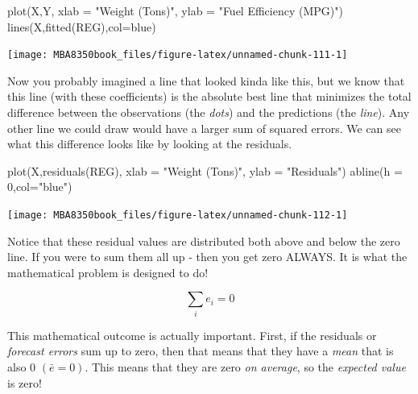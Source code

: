 \documentclass[
]{book}
\newenvironment{Shaded}{\begin{snugshade}}{\end{snugshade}}
\newcommand{\AttributeTok}[1]{\textcolor[rgb]{0.77,0.63,0.00}{#1}}
\newcommand{\DecValTok}[1]{\textcolor[rgb]{0.00,0.00,0.81}{#1}}
\newcommand{\FunctionTok}[1]{\textcolor[rgb]{0.00,0.00,0.00}{#1}}
\newcommand{\NormalTok}[1]{#1}
\newcommand{\StringTok}[1]{\textcolor[rgb]{0.31,0.60,0.02}{#1}}
\begin{document}
\begin{Shaded}
\begin{Highlighting}[]
\FunctionTok{plot}\NormalTok{(X,Y,}
     \AttributeTok{xlab =} \StringTok{"Weight (Tons)"}\NormalTok{,}
     \AttributeTok{ylab =} \StringTok{"Fuel Efficiency (MPG)"}\NormalTok{)}
\FunctionTok{lines}\NormalTok{(X,}\FunctionTok{fitted}\NormalTok{(REG),}\AttributeTok{col=}\StringTok{\textquotesingle{}blue\textquotesingle{}}\NormalTok{)}
\end{Highlighting}
\end{Shaded}

\begin{center}\texttt{[image: MBA8350book\_files/figure-latex/unnamed-chunk-111-1]} \end{center}

Now you probably imagined a line that looked kinda like this, but we know that this line (with these coefficients) is the absolute best line that minimizes the total difference between the observations (the \emph{dots}) and the predictions (the \emph{line}). Any other line we could draw would have a larger sum of squared errors. We can see what this difference looks like by looking at the residuals.

\begin{Shaded}
\begin{Highlighting}[]
\FunctionTok{plot}\NormalTok{(X,}\FunctionTok{residuals}\NormalTok{(REG),}
     \AttributeTok{xlab =} \StringTok{"Weight (Tons)"}\NormalTok{,}
     \AttributeTok{ylab =} \StringTok{"Residuals"}\NormalTok{)}
\FunctionTok{abline}\NormalTok{(}\AttributeTok{h =} \DecValTok{0}\NormalTok{,}\AttributeTok{col=}\StringTok{"blue"}\NormalTok{)}
\end{Highlighting}
\end{Shaded}

\begin{center}\texttt{[image: MBA8350book\_files/figure-latex/unnamed-chunk-112-1]} \end{center}

Notice that these residual values are distributed both above and below the zero line. If you were to sum them all up - then you get zero ALWAYS. It is what the mathematical problem is designed to do!

\[\sum_ie_i=0\]

This mathematical outcome is actually important. First, if the residuals or \emph{forecast errors} sum up to zero, then that means that they have a \emph{mean} that is also 0 \((\bar{e}=0)\). This means that they are zero \emph{on average}, so the \emph{expected value} is zero!
\end{document}
